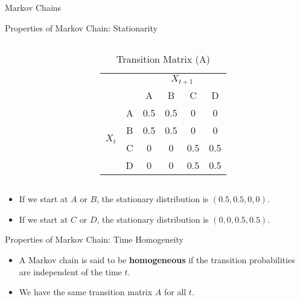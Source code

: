 \documentclass{beamer}
\begin{document}
\begin{section}{Markov Chains}
\begin{frame}{Properties of Markov Chain: Stationarity}
\begin{columns}[T]
\begin{column}{0.48\textwidth}
            \end{column}
            \begin{column}{0.48\textwidth} %
              \begin{table}[h]
                \centering
                \caption{Transition Matrix (A)}
                \small 
                \begin{tabular}{cccccc}
                  \toprule
                  & & \multicolumn{4}{c}{\(X_{t+1}\)} \\
                  \cmidrule{3-6}
                  & & A & B & C & D \\
                  \midrule
                  \multirow{4}{*}{\(X_t\)} & A & 0.5 & 0.5 & 0 & 0 \\
                  & B & 0.5 & 0.5 & 0 & 0 \\
                  & C & 0 & 0 & 0.5 & 0.5 \\
                  & D & 0 & 0 & 0.5 & 0.5 \\
                  \bottomrule
                \end{tabular}
              \end{table}
            \end{column}
          \end{columns}

          \pause \begin{itemize}
            \item If we start at $A$ or $B$, the stationary distribution is $(0.5, 0.5, 0, 0)$.
            \item If we start at $C$ or $D$, the stationary distribution is $(0, 0, 0.5, 0.5)$.
          \end{itemize}

        \end{frame}

\end{section}

\begin{frame}{Properties of Markov Chain: Time Homogeneity}
    \begin{itemize}
        \item A Markov chain is said to be \textbf{homogeneous} if the transition probabilities are independent of the time $t$.
        \pause \item We have the same transition matrix $A$ for all $t$.
    \end{itemize}
    
\end{frame}
\end{document}
